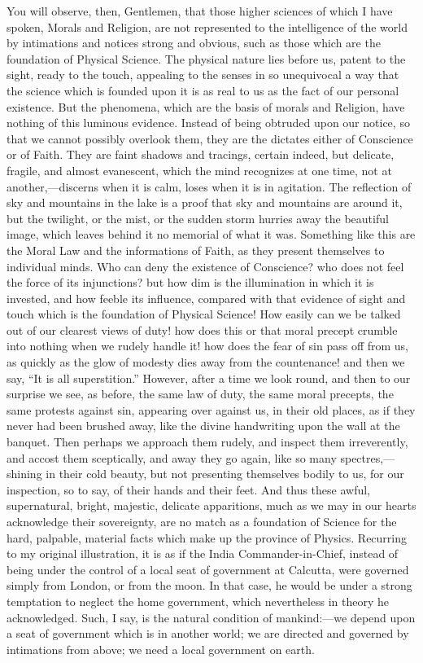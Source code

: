 You will observe, then, Gentlemen, that those higher sciences of
which I have spoken, Morals and Religion, are not represented to the
intelligence of the world by intimations and notices strong and
obvious, such as those which are the foundation of Physical
Science. The physical nature lies before us, patent to the sight,
ready to the touch, appealing to the senses in so unequivocal a way
that the science which is founded upon it is as real to us as the fact
of our personal existence. But the phenomena, which are the basis of
morals and Religion, have nothing of this luminous evidence. Instead
of being obtruded upon our notice, so that we cannot possibly overlook
them, they are the dictates either of Conscience or of Faith. They are
faint shadows and tracings, certain indeed, but delicate, fragile, and
almost evanescent, which the mind recognizes at one time, not at
another,—discerns when it is calm, loses when it is in agitation.
The reflection of sky and mountains in the lake is a proof that sky
and mountains are around it, but the twilight, or the mist, or the
sudden storm hurries away the beautiful image, which leaves behind it
no memorial of what it was. Something like this are the Moral Law and
the informations of Faith, as they present themselves to individual
minds. Who can deny the existence of Conscience? who does not feel the
force of its injunctions? but how dim is the illumination in which it
is invested, and how feeble its influence, compared with that evidence
of sight and touch which is the foundation of Physical Science! How
easily can we be talked out of our clearest views of duty! how does
this or that moral precept crumble into nothing when we rudely handle
it! how does the fear of sin pass off from us, as quickly as the glow
of modesty dies away from the countenance! and then we say, ``It
is all superstition.'' However, after a time we look round, and
then to our surprise we see, as before, the same law of duty, the same
moral precepts, the same protests against sin, appearing over against
us, in their old places, as if they never had been brushed away,
like the divine handwriting upon the wall at the banquet. Then perhaps
we approach them rudely, and inspect them irreverently, and accost
them sceptically, and away they go again, like so many spectres,—shining
in their cold beauty, but not presenting themselves bodily to us, for
our inspection, so to say, of their hands and their feet. And thus
these awful, supernatural, bright, majestic, delicate apparitions,
much as we may in our hearts acknowledge their sovereignty, are no
match as a foundation of Science for the hard, palpable, material
facts which make up the province of Physics. Recurring to my original
illustration, it is as if the India Commander-in-Chief, instead of
being under the control of a local seat of government at Calcutta,
were governed simply from London, or from the moon. In that case, he
would be under a strong temptation to neglect the home government,
which nevertheless in theory he acknowledged. Such, I say, is the
natural condition of mankind:—we depend upon a seat of government
which is in another world; we are directed and governed by intimations
from above; we need a local government on earth.

